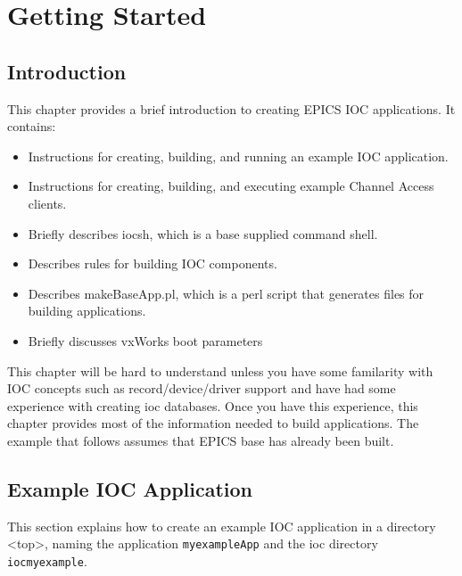 





\chapter{Getting Started}

\section{Introduction}

This chapter provides a brief introduction to creating EPICS IOC applications. It contains:

\begin{itemize}\item Instructions for creating, building, and running an example IOC application.

\item Instructions for creating, building, and executing example Channel Access clients.

\item Briefly describes iocsh, which is a base supplied command shell.

\item Describes rules for building IOC components.

\item Describes makeBaseApp.pl, which is a perl script that generates files for building applications.

\item Briefly discusses vxWorks boot parameters

\end{itemize}This chapter will be hard to understand unless you have some familarity with IOC concepts such as record/device/driver 
support and have had some experience with creating ioc databases. Once you have this experience, this chapter provides 
most of the information needed to build applications. The example that follows assumes that EPICS base has already been 
built.

\section{Example IOC Application}

This section explains how to create an example IOC application in a directory \textless{}top\textgreater{}, naming the application 
\verb|myexampleApp| and the ioc directory \verb|iocmyexample|.

